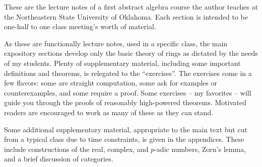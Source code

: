 These are the lecture notes of a first abstract algebra course the author teaches at the Northeastern State University of Oklahoma. Each section is intended to be one-half to one class meeting's worth of material.

As these are functionally lecture notes, used in a specific class, the main expository sections develop only the basic theory of rings as dictated by the needs of my students. Plenty of supplementary material, including some important definitions and theorems, is relegated to the ``exercises''. The exercises come in a few flavors: some are straight computation, some ask for examples or counterexamples, and some require a proof. Some exercises -- my favorites -- will guide you through the proofs of reasonably high-powered theorems. Motivated readers are encouraged to work as many of these as they can stand.

Some additional supplementary material, appropriate to the main text but cut from a typical class due to time constraints, is given in the appendices. These include constructions of the real, complex, and \(p\)-adic numbers, Zorn's lemma, and a brief discussion of categories.

